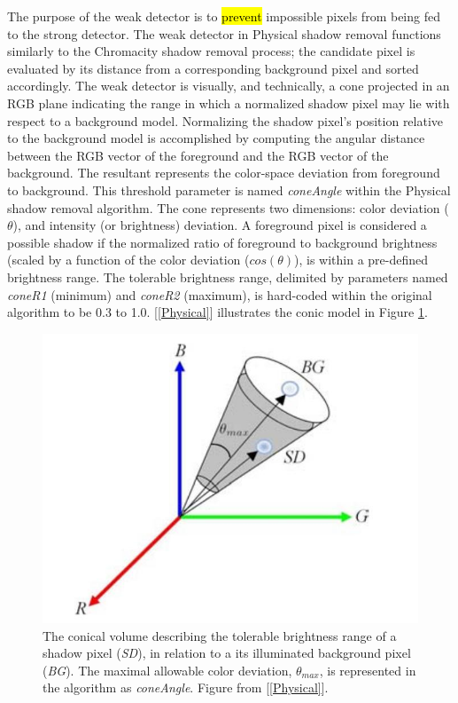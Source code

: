 The purpose of the weak detector is to \hl{prevent} impossible pixels from being fed to the strong detector. The weak detector in Physical shadow removal functions similarly to the Chromacity shadow removal process; the candidate pixel is evaluated by its distance from a corresponding background pixel and sorted accordingly. The weak detector is visually, and technically, a cone projected in an RGB plane indicating the range in which a normalized shadow pixel may lie with respect to a background model. Normalizing the shadow pixel's position relative to the background model is accomplished by computing the angular distance between the RGB vector of the foreground and the RGB vector of the background. The resultant represents the color-space deviation from foreground to background. This threshold parameter is named \textit{coneAngle} within the Physical shadow removal algorithm. The cone represents two dimensions: color deviation ($\theta$), and intensity (or brightness) deviation. A foreground pixel is considered a possible shadow if the normalized ratio of foreground to background brightness (scaled by a function of the color deviation ($cos(\theta)$), is within a pre-defined brightness range. The tolerable brightness range, delimited by parameters named \textit{coneR1} (minimum) and \textit{coneR2} (maximum), is hard-coded within the original algorithm to be 0.3 to 1.0. [\ref{Physical}] illustrates the conic model in Figure \ref{fig:cone_physical}.

\begin{figure}
  \centering
  \includegraphics[width=.7\linewidth]{figures/cone_physical.jpg}
  \caption{The conical volume describing the tolerable brightness range of a shadow pixel (\textit{SD}), in relation to a its illuminated background pixel (\textit{BG}). The maximal allowable color deviation, $\theta_{max}$, is represented in the algorithm as \textit{coneAngle}. Figure from [\ref{Physical}].}
  \label{fig:cone_physical}
\end{figure}

